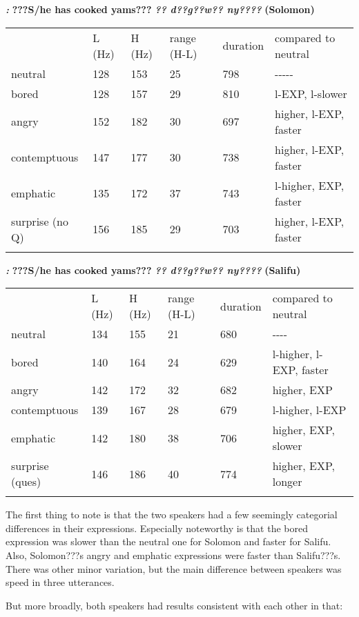 \documentclass[output=paper]{langsci/langscibook}
\begin{document}
\emph{\textbf{\textup{:}}}\textbf{ ???}\textbf{S/he has cooked yams???  }\emph{\textbf{?? d??g??w?? ny????}}\textbf{  (Solomon) }

\begin{tabularx}{\textwidth}{XXXXXX} & L (Hz) & H (Hz) & range (H-L) & duration & compared to neutral\\
\lsptoprule
neutral & 128 & 153 & 25 & 798 & {}-{}-{}-{}-{}-\\
bored & 128 & 157 & 29 & 810 & l-EXP, l-slower\\
angry & 152 & 182 & 30 & 697 & higher, l-EXP, faster\\
contemptuous & 147 & 177 & 30 & 738 & higher, l-EXP, faster\\
emphatic & 135 & 172 & 37 & 743 & l-higher, EXP, faster\\
surprise (no Q) & 156 & 185 & 29 & 703 & higher, l-EXP, faster\\
\lspbottomrule
\end{tabularx}
\emph{\textbf{\textup{:}}}\textbf{ ???}\textbf{S/he has cooked yams???  }\emph{\textbf{?? d??g??w?? ny????}}\textbf{  (Salifu)}

\begin{tabularx}{\textwidth}{XXXXXX} & L (Hz) & H (Hz) & range (H-L) & duration & compared to neutral\\
\lsptoprule
neutral & 134 & 155 & 21 & 680 & {}-{}-{}-{}-\\
bored & 140 & 164 & 24 & 629 & l-higher, l-EXP, faster\\
angry & 142 & 172 & 32 & 682 & higher, EXP\\
contemptuous & 139 & 167 & 28 & 679 & l-higher, l-EXP\\
emphatic & 142 & 180 & 38 & 706 & higher, EXP, slower\\
surprise (ques) & 146 & 186 & 40 & 774 & higher, EXP, longer\\
\lspbottomrule
\end{tabularx}
The first thing to note is that the two speakers had a few seemingly categorial differences in their expressions. Especially noteworthy is that the bored expression was slower than the neutral one for Solomon and faster for Salifu. Also, Solomon???s angry and emphatic expressions were faster than Salifu???s. There was other minor variation, but the main difference between speakers was speed in three utterances.

But more broadly, both speakers had results consistent with each other in that:
\end{document}
